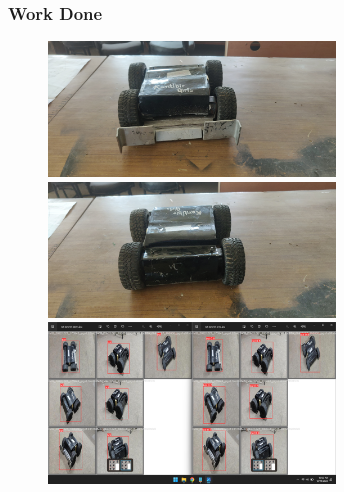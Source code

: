 \subsubsection{Work Done}
\begin{figure}[!th] %
	\includegraphics[width = 3in]{images/botpic10.jpg} 
	\hspace{.5cm}
	\includegraphics[width = 3in]{images/botpic11.jpg} 
	\label{figSample1} %
	\includegraphics[width = 3in]{images/botlap.png} 
	\label{figSample1} %
\end{figure}


